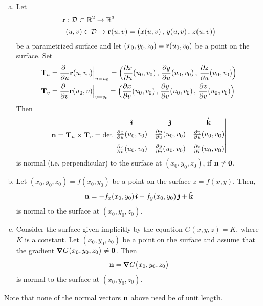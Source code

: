 \begin{theorem}\label{thm:normalVectors}

\begin{enumerate}[(a)]

\item
Let
\begin{align*}
\mathbf{r}&: \mathcal{D}\subset\mathbb{R}^2 \rightarrow \mathbb{R}^3 \\
   &(u,v) \in\mathcal{D} \mapsto \mathbf{r}(u,v) =\big(x(u,v)\,,\,y(u,v)\,,\,z(u,v)\big)
\end{align*}
be a parametrized surface and let $(x_0,y_0,z_0)=\mathbf{r}(u_0,v_0)$ 
be a point on the surface. Set
\begin{align*}
\mathbf{T}_u &= \frac{\partial\ }{\partial u}\mathbf{r}(u,v_0)\Big|_{u=u_0}
=\Big(\frac{\partial x}{\partial u}(u_0,v_0)\,,\,
      \frac{\partial y}{\partial u}(u_0,v_0)\,,\,
      \frac{\partial z}{\partial u}(u_0,v_0)\Big) \\
\mathbf{T}_v &= \frac{\partial\ }{\partial v}\mathbf{r}(u_0,v)\Big|_{v=v_0}
=\Big(\frac{\partial x}{\partial v}(u_0,v_0)\,,\,
      \frac{\partial y}{\partial v}(u_0,v_0)\,,\,
      \frac{\partial z}{\partial v}(u_0,v_0)\Big)
\end{align*}
Then
\begin{align*}
\mathbf{n} = \mathbf{T}_u\times\mathbf{T}_v
=\det\left|\begin{matrix}
            \hat{\pmb{\imath}} &  \hat{\pmb{\jmath}} & \hat{\mathbf{k}} \\[0.05in]
            \frac{\partial x}{\partial u}(u_0,v_0) &
                     \frac{\partial y}{\partial u}(u_0,v_0) &
                     \frac{\partial z}{\partial u}(u_0,v_0) \\[0.1in]
           \frac{\partial x}{\partial v}(u_0,v_0) &
                     \frac{\partial y}{\partial v}(u_0,v_0) &
                     \frac{\partial z}{\partial v}(u_0,v_0)
           \end{matrix}\right|
\end{align*}
is normal (i.e. perpendicular) to the surface at $(x_0,y_0,z_0)$, if $\mathbf{n}\ne \mathbf{0}$.


\item
Let $(x_0,y_0,z_0)=f(x_0,y_0)$ be a point on the surface $z=f(x,y)$. Then, 
\begin{align*}
\mathbf{n} =-f_x(x_0,y_0)\,\hat{\pmb{\imath}} - f_y(x_0,y_0)\,\hat{\pmb{\jmath}} + \hat{\mathbf{k}}
\end{align*}
is normal to the surface at $(x_0,y_0,z_0)$.

\item 
Consider the surface given implicitly by the equation $G(x,y,z) = K$, 
where $K$ is a constant. Let $(x_0,y_0,z_0)$ be a point on the surface and assume that the gradient $\vnabla G\big(x_0,y_0,z_0\big)\ne \vZero$. Then
\begin{align*}
\vn= \vnabla G\big(x_0,y_0,z_0\big)
\end{align*}
is normal to the surface at $(x_0,y_0,z_0)$.

\end{enumerate}

Note that none of the normal vectors $\mathbf{n}$ above need be of unit length.
\end{theorem}
